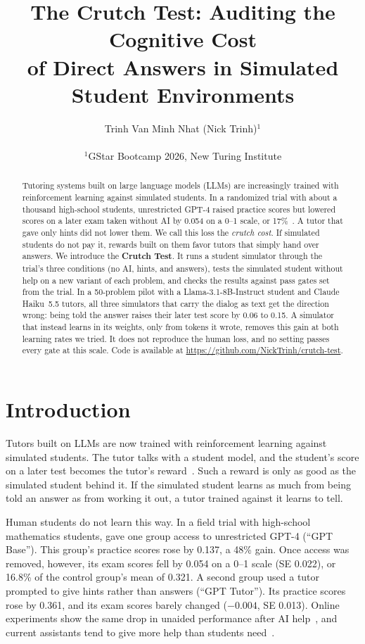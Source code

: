 \documentclass{article} %
\title{The Crutch Test: Auditing the Cognitive Cost\\of Direct Answers in Simulated\\Student Environments}
\author{
\begin{tabular}{@{}l}
Trinh Van Minh Nhat (Nick Trinh)$^{1}$
\end{tabular}\\
$^1$GStar Bootcamp 2026, New Turing Institute\\
}
\begin{document}
\maketitle

\begin{abstract}
Tutoring systems built on large language models (LLMs) are increasingly trained with reinforcement learning against simulated students. In a randomized trial with about a thousand high-school students, unrestricted GPT-4 raised practice scores but lowered scores on a later exam taken without AI by 0.054 on a 0--1 scale, or 17\%~\citep{bastani2025harm}. A tutor that gave only hints did not lower them. We call this loss the \emph{crutch cost}. If simulated students do not pay it, rewards built on them favor tutors that simply hand over answers. We introduce the \textbf{Crutch Test}. It runs a student simulator through the trial's three conditions (no AI, hints, and answers), tests the simulated student without help on a new variant of each problem, and checks the results against pass gates set from the trial. In a 50-problem pilot with a Llama-3.1-8B-Instruct student and Claude Haiku~5.5 tutors, all three simulators that carry the dialog as text get the direction wrong: being told the answer raises their later test score by 0.06 to 0.15. A simulator that instead learns in its weights, only from tokens it wrote, removes this gain at both learning rates we tried. It does not reproduce the human loss, and no setting passes every gate at this scale. Code is available at \url{https://github.com/NickTrinh/crutch-test}.
\end{abstract}

\section{Introduction}
\label{sec:introduction}

Tutors built on LLMs are now trained with reinforcement learning against simulated students. The tutor talks with a student model, and the student's score on a later test becomes the tutor's reward~\citep{dinucujianu2025tutorrl,scarlatos2025training,chang2026pearl,xu2026sherpa,macina2026assistance}. Such a reward is only as good as the simulated student behind it. If the simulated student learns as much from being told an answer as from working it out, a tutor trained against it learns to tell.

Human students do not learn this way. In a field trial with high-school mathematics students, \citet{bastani2025harm} gave one group access to unrestricted GPT-4 (``GPT Base''). This group's practice scores rose by 0.137, a 48\% gain. Once access was removed, however, its exam scores fell by 0.054 on a 0--1 scale (SE 0.022), or 16.8\% of the control group's mean of 0.321. A second group used a tutor prompted to give hints rather than answers (``GPT Tutor''). Its practice scores rose by 0.361, and its exam scores barely changed ($-0.004$, SE 0.013). Online experiments show the same drop in unaided performance after AI help~\citep{liu2026assistance,shen2026skill}, and current assistants tend to give more help than students need~\citep{teo2026overassist}.
\end{document}
